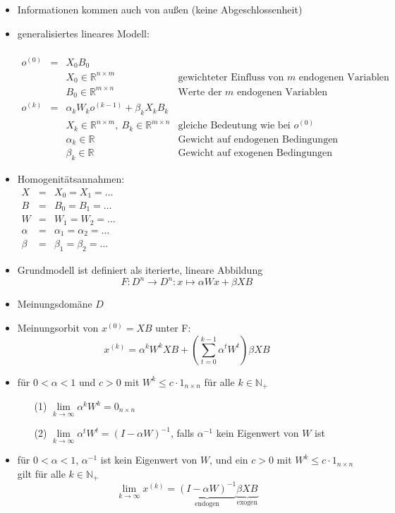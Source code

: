 \begin{itemize}
\setlength{\itemsep}{0pt}
	\item Informationen kommen auch von außen (keine Abgeschlossenheit)
	\item generalisiertes lineares Modell:\\\vspace*{-0.5\baselineskip}\\
		$\begin{array}{rcll}
			o^{(0)}&=& X_0B_0 &\\
			&&X_0\in\mathbb{R}^{n\times m}&\text{gewichteter Einfluss von }m\text{ endogenen Variablen}\\
			&& B_0\in\mathbb{R}^{m\times n}&\text{Werte der }m\text{ endogenen Variablen}\\
			o^{(k)}&=&\alpha_kW_ko^{(k-1)}+\beta_kX_kB_k&\\
			&&X_k\in\mathbb{R}^{n\times m},~B_k\in\mathbb{R}^{m\times n}&\text{gleiche Bedeutung wie bei }o^{(0)}\\
			&&\alpha_k\in\mathbb{R}&\text{Gewicht auf endogenen Bedingungen}\\
			&&\beta_k\in\mathbb{R}&\text{Gewicht auf exogenen Bedingungen}
		\end{array}$
	\item Homogenitätsannahmen:\\
		$\begin{array}{rcl}
			X&=&X_0=X_1=\dots\\
			B&=&B_0=B_1=\dots\\
			W&=& W_1=W_2=\dots\\
			\alpha&=&\alpha_1=\alpha_2=\dots\\
			\beta&=&\beta_1=\beta_2=\dots
		\end{array}$
	\item Grundmodell ist definiert als iterierte, lineare Abbildung
		\[F:D^n\rightarrow D^n: x\mapsto \alpha Wx+\beta XB\]
	\item Meinungsdomäne $D$
	\item Meinungsorbit von $x^{(0)}=XB$ unter F:
		\[x^{(k)}=\alpha^kW^kXB+\left(\sum\limits_{t=0}^{k-1}\alpha^tW^t\right)\beta XB\]
\end{itemize}
\topbreak
\vspace*{-\baselineskip}
\begin{itemize}
	\item für $0<\alpha<1$ und $c>0$ mit $W^k\leq c\cdot 1_{n\times n}$ für alle $k\in\mathbb{N}_+$
		\begin{enumerate}
			\item[(1)] $\lim\limits_{k\rightarrow\infty}\alpha^kW^k = 0_{n\times n}$
			\item[(2)] $\lim\limits_{k\rightarrow\infty}\alpha^tW^t = (I-\alpha W)^{-1}$, falls $\alpha^{-1}$ kein Eigenwert von $W$ ist
		\end{enumerate}
	\item für $0<\alpha <1$, $\alpha^{-1}$ ist kein Eigenwert von $W$, und ein $c>0$ mit $W^k\leq c\cdot 1_{n\times n}$ gilt für alle $k\in\mathbb{N}_+$
		\[\lim_{k\rightarrow\infty}x^{(k)}=\underbrace{(I-\alpha W)^{-1}}_{\text{endogen}}\underbrace{\beta XB}_{\text{exogen}}\]
\end{itemize}